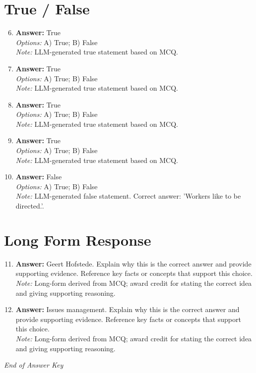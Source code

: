 \documentclass[12pt]{article}
\begin{document}
\section*{True / False}
\begin{enumerate}[label=\arabic*.]
\setcounter{enumi}{5}
\item \textbf{Answer:} True
\\ \textit{Options:} A) True; B) False
\\ \textit{Note:} LLM-generated true statement based on MCQ.
\item \textbf{Answer:} True
\\ \textit{Options:} A) True; B) False
\\ \textit{Note:} LLM-generated true statement based on MCQ.
\item \textbf{Answer:} True
\\ \textit{Options:} A) True; B) False
\\ \textit{Note:} LLM-generated true statement based on MCQ.
\item \textbf{Answer:} True
\\ \textit{Options:} A) True; B) False
\\ \textit{Note:} LLM-generated true statement based on MCQ.
\item \textbf{Answer:} False
\\ \textit{Options:} A) True; B) False
\\ \textit{Note:} LLM-generated false statement. Correct answer: 'Workers like to be directed.'.
\end{enumerate}

\section*{Long Form Response}
\begin{enumerate}[label=\arabic*.]
\setcounter{enumi}{10}
\item \textbf{Answer:} Geert Hofstede. Explain why this is the correct answer and provide supporting evidence. Reference key facts or concepts that support this choice.
\\ \textit{Note:} Long-form derived from MCQ; award credit for stating the correct idea and giving supporting reasoning.
\item \textbf{Answer:} Issues management. Explain why this is the correct answer and provide supporting evidence. Reference key facts or concepts that support this choice.
\\ \textit{Note:} Long-form derived from MCQ; award credit for stating the correct idea and giving supporting reasoning.
\end{enumerate}

\vfill
\noindent\textit{End of Answer Key}
\end{document}

